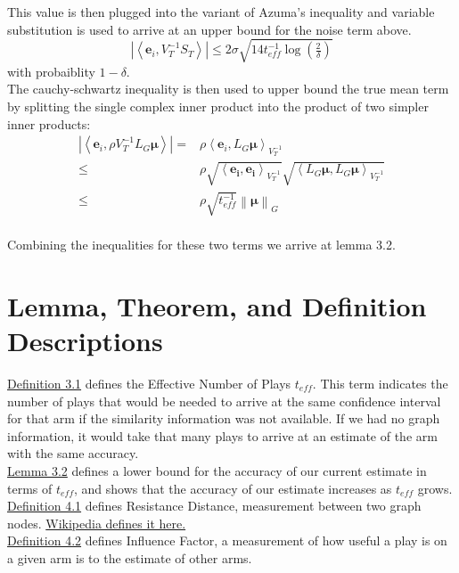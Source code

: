 \documentclass{article}[12pt]
\newcommand{\abs}[1]{\left\lvert #1 \right\rvert}
\newcommand{\norm}[1]{\left\|#1\right\|}
\newcommand{\ip}[2]{\left\langle #1,#2 \right\rangle}
\begin{document}
This value is then plugged into the variant of Azuma’s inequality and variable substitution is used to arrive at an upper bound for the noise term above.
\begin{equation}
  \abs{\ip{\bm{e}_i}{V^{-1}_T S_T}} \leq 2\sigma \sqrt{14t_{eff}^{-1} \log\left( \tfrac{2}{\delta}\right)}
\end{equation}
with probaiblity $1 - \delta$.\\

The cauchy-schwartz inequality is then used to upper bound the true mean term by splitting the single complex inner product into the product of two simpler inner products:
\begin{eqnarray}
  \abs{\ip{\bm{e}_i}{\rho V^{-1}_T L_G \bm{\mu}}} = & \rho \ip{\bm{e}_i}{L_G \bm{\mu}}_{V^{-1}_T} \\
  \leq & \rho \sqrt{\ip{\bm{e_i}}{\bm{e_i}}_{V^{-1}_T}} \sqrt{\ip{L_G \bm{\mu}}{L_G \bm{\mu}}_{V^{-1}_T}} \\
  \leq & \rho \sqrt{t_{eff}^{-1}} \norm{\bm{\mu}}_G
\end{eqnarray} \\

Combining the inequalities for these two terms we arrive at lemma 3.2.

\pagebreak

\section{Lemma, Theorem, and Definition Descriptions}

\underline{Definition 3.1} defines the Effective Number of Plays $t_{eff}$.
This term indicates the number of plays that would be needed to arrive at the same confidence interval for that arm if the similarity information was not available.
If we had no graph information, it would take that many plays to arrive at an estimate of the arm with the same accuracy. \\

\underline{Lemma 3.2} defines a lower bound for the accuracy of our current estimate in terms of $t_{eff}$,
and shows that the accuracy of our estimate increases as $t_{eff}$ grows. \\

\underline{Definition 4.1} defines Resistance Distance, measurement between two graph nodes.
\href{https://en.wikipedia.org/wiki/Resistance_distance}{Wikipedia defines it here.} \\

\underline{Definition 4.2} defines Influence Factor, a measurement of how useful a play is on a given arm is to the estimate of other arms. \\
\end{document}

